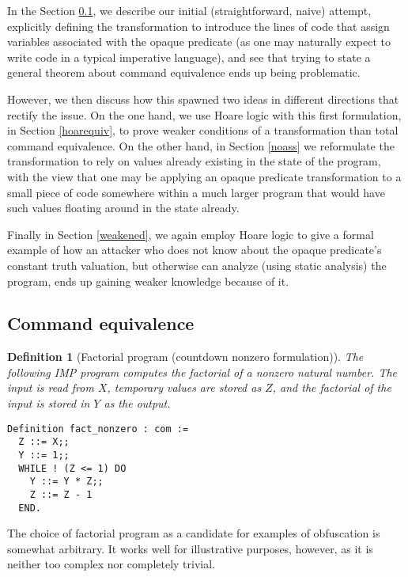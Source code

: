 \documentclass[compsoc,conference,a4paper,10pt,times]{IEEEtran}
\newtheorem{defin}[theorem]{Definition}
\begin{document}
\par In the Section \ref{naive}, we describe our initial (straightforward, naive) attempt, explicitly defining the transformation to introduce the lines of code that assign variables associated with the opaque predicate (as one may naturally expect to write code in a typical imperative language), and see that trying to state a general theorem about command equivalence ends up being problematic.  
\par However, we then discuss how this spawned two ideas in different directions that rectify the issue.  On the one hand, we use Hoare logic with this first formulation, in Section \ref{hoarequiv}, to prove weaker conditions of a transformation than total command equivalence.  On the other hand, in Section \ref{noass} we reformulate the transformation to rely on values already existing in the state of the program, with the view that one may be applying an opaque predicate transformation to a small piece of code somewhere within a much larger program that would have such values floating around in the state already.
\par Finally in Section \ref{weakened}, we again employ Hoare logic to give a formal example of how an attacker who does not know about the opaque predicate's constant truth valuation, but otherwise can analyze (using static analysis) the program, ends up gaining weaker knowledge because of it.

\subsection{Command equivalence}\label{naive}
\begin{defin}[Factorial program (countdown nonzero formulation)]\label{Fact}
    The following IMP program computes the factorial of a nonzero natural number.  The input is read from $X$, temporary values are stored as $Z$, and the factorial of the input is stored in $Y$ as the output.
\begin{verbatim}
Definition fact_nonzero : com :=
  Z ::= X;;
  Y ::= 1;;
  WHILE ! (Z <= 1) DO
    Y ::= Y * Z;;
    Z ::= Z - 1
  END.
\end{verbatim}
\end{defin}

    The choice of factorial program as a candidate for examples of obfuscation is somewhat arbitrary.  It works well for illustrative purposes, however, as it is neither too complex nor completely trivial.
\end{document}
